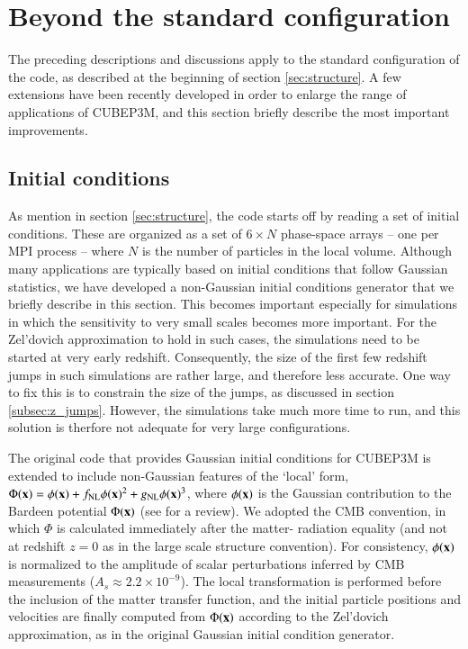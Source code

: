 \documentclass[useAMS,usenatbib]{mn2e}
\begin{document}


%

\section{Beyond the standard configuration}
\label{sec:extensions}

The preceding descriptions and discussions apply to the standard configuration of the code, 
as described at the beginning of section \ref{sec:structure}. A few extensions have been recently developed
in order to enlarge the range of applications of {\small CUBEP3M}, and this section briefly 
describe the most important improvements.

\subsection{Initial conditions}
\label{subsec:init}

As mention in section \ref{sec:structure}, the code starts off by reading a set of initial conditions.
These are organized as a set of $6 \times N$ phase-space arrays -- one per {\small MPI} process -- where $N$ is the number of particles in the
local volume. Although many applications are typically based on initial conditions that follow Gaussian statistics,
we have developed a non-Gaussian initial conditions generator that we briefly describe in this section. 
This becomes important especially for simulations in which the sensitivity to very small scales becomes more important.
For the Zel'dovich approximation to hold in such cases, the simulations need to be started at very early redshift.
Consequently, the size of the first few redshift jumps in such simulations are rather large, and therefore less accurate. 
One way to fix this is to constrain the size of the jumps, as discussed in section \ref{subsec:z_jumps}.
However,  the simulations take much more time to run, and this solution is therfore not adequate for 
very large configurations.

The original code that provides Gaussian initial conditions for {\small CUBEP3M} 
is extended to include non-Gaussian features of the `local' form,
$\Phi({\bf x})=\phi({\bf x})+f_{\rm NL} \phi({\bf x})^2 + g_{\rm NL} 
\phi({\bf x})^3$, where $\phi({\bf x})$ is the Gaussian contribution
to the Bardeen potential $\Phi({\bf x})$ (see \cite{2004PhR...402..103B} for a review). 
We adopted the CMB convention,
in which $\Phi$ is calculated immediately after the matter-
radiation equality (and not at redshift $z=0$ as in the large scale
structure convention). For consistency, $\phi({\bf x})$ is normalized
to the amplitude of scalar perturbations inferred by CMB measurements
($A_s\approx 2.2 \times 10^{-9}$). The local transformation is performed 
before the inclusion of the matter transfer function, and the initial 
particle positions and velocities are finally computed from $\Phi({\bf x})$ 
according to the Zel'dovich approximation, as in the original Gaussian initial condition generator.
\end{document}
